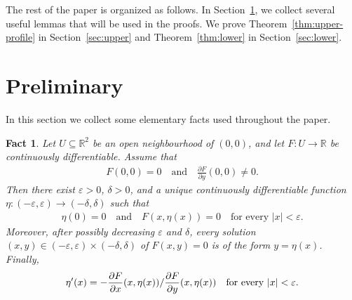 \documentclass[10pt,a4paper]{article}
\newtheorem{fact}[definition]{Fact}
\begin{document}
The rest of the paper is organized as follows. In Section~\ref{sec:prep}, we
collect several useful lemmas that will be used in the proofs. We prove
Theorem~\ref{thm:upper-profile} in Section~\ref{sec:upper} and
Theorem~\ref{thm:lower} in Section~\ref{sec:lower}.













\section{Preliminary}\label{sec:prep}

In this section we collect some elementary facts used throughout the paper.  



\begin{fact}\cite[Theorem 9.28]{Rudin}\label{fact:ift}
Let \(U\subseteq \mathbb{R}^{2}\) be an open neighbourhood of
\((0,0)\), and let \(F:U\to\mathbb{R}\) be continuously differentiable.
Assume that
\begin{align*}
        F(0,0)=0
        \quad\text{and}\quad
         \frac{\partial F}{\partial y}(0,0)\neq 0 .
\end{align*}
Then there exist \(\varepsilon>0\), \(\delta>0\), and a unique
continuously differentiable function $\eta:(-\varepsilon,\varepsilon)\to (-\delta,\delta)$
such that
\begin{align*}
        \eta(0)=0
        \quad\text{and}\quad
        F(x,\eta(x))=0
        \quad\text{for every } |x|<\varepsilon .
\end{align*}
Moreover, after possibly decreasing \(\varepsilon\) and \(\delta\), every
solution \((x,y)\in(-\varepsilon,\varepsilon)\times(-\delta,\delta)\) of
\(F(x,y)=0\) is of the form \(y=\eta(x)\). Finally,
\begin{align*}
\eta'(x)
        =
        -\frac{\partial F}{\partial x}(x,\eta(x)){\huge /}\frac{\partial F}{\partial y}(x,\eta(x))
        \quad\text{for every } |x|<\varepsilon.
\end{align*}
\end{fact}
\end{document}
